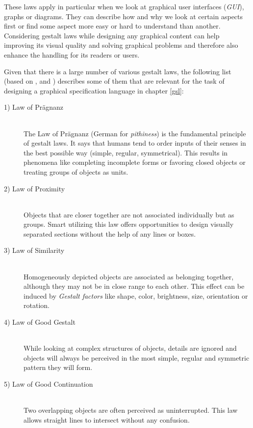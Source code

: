 \documentclass[twoside, openright, 12pt]{book}
\begin{document}
These laws apply in particular when we look at graphical user interfaces (\textit{GUI}), graphs or diagrams.
They can describe how and why we look at certain aspects first or find some aspect more easy or hard to understand than another.
Considering gestalt laws while designing any graphical content can help improving its visual quality and solving graphical problems and therefore also enhance the handling for its readers or users.

Given that there is a large number of various gestalt laws, the following list (based on \citep{Goeckel01a}, \citep{Heinecke04a} and \citep{Sternberg}) describes some of them that are relevant for the task of designing a graphical specification language in chapter \ref{gsl}:

\begin{description}
\item[1) Law of Prägnanz]\hfill \\
The Law of Prägnanz (German for \textit{pithiness}) is the fundamental principle of gestalt laws.
It says that humans tend to order inputs of their senses in the best possible way (simple, regular, symmetrical).
This results in phenomena like completing incomplete forms or favoring closed objects or treating groups of objects as units.

\item[2) Law of Proximity]\hfill \\
Objects that are closer together are not associated individually but as groups.
Smart utilizing this law offers opportunities to design visually separated sections without the help of any lines or boxes.

\item[3) Law of Similarity]\hfill \\
Homogeneously depicted objects are associated as belonging together, although they may not be in close range to each other.
This effect can be induced by \textit{Gestalt factors} like shape, color, brightness, size, orientation or rotation.

\item[4) Law of Good Gestalt]\hfill \\
While looking at complex structures of objects, details are ignored and objects will always be perceived in the most simple, regular and symmetric pattern they will form.

\item[5) Law of Good Continuation]\hfill \\
Two overlapping objects are often perceived as uninterrupted.
This law allows straight lines to intersect without any confusion.
\end{description}
\end{document}
